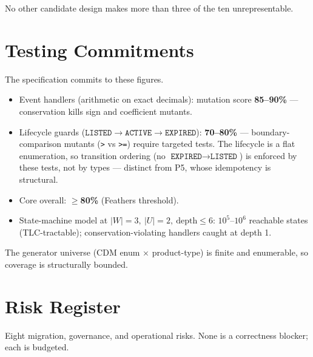 \documentclass[11pt,a4paper]{article}
\begin{document}
\noindent No other candidate design makes more than three of the ten unrepresentable.

\section{Testing Commitments}
\label{sec:mutationscore}

The specification commits to these figures.

\begin{itemize}[leftmargin=*]
\item Event handlers (arithmetic on exact decimals): mutation score \textbf{85--90\%} ---
conservation kills sign and coefficient mutants.
\item Lifecycle guards ($\texttt{LISTED}\to\texttt{ACTIVE}\to\texttt{EXPIRED}$):
\textbf{70--80\%} --- boundary-comparison mutants (\texttt{>} vs \texttt{>=}) require
targeted tests. The lifecycle is a flat enumeration, so transition ordering (no
$\texttt{EXPIRED}\to\texttt{LISTED}$) is enforced by these tests, not by types --- distinct
from P5, whose idempotency is structural.
\item Core overall: $\geq$\textbf{80\%} (Feathers threshold).
\item State-machine model at $|W|=3,\ |U|=2,\ \text{depth}\leq 6$: $10^5$--$10^6$ reachable
states (TLC-tractable); conservation-violating handlers caught at depth 1.
\end{itemize}

\noindent The generator universe (CDM enum $\times$ product-type) is finite and enumerable,
so coverage is structurally bounded.

\section{Risk Register}
\label{sec:risk}

Eight migration, governance, and operational risks. None is a correctness blocker; each is
budgeted.
\end{document}
